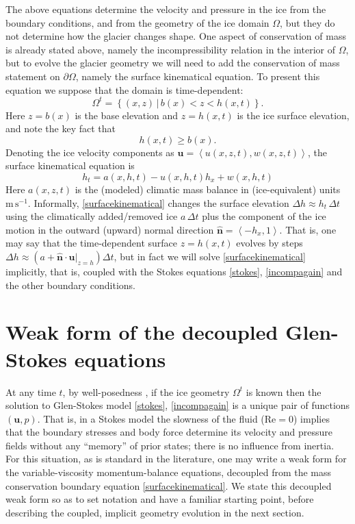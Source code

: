 \documentclass[letterpaper,final,12pt,reqno]{amsart}
\newcommand{\hbn}{\hat{\mathbf{n}}}
\newcommand{\bu}{\mathbf{u}}
\begin{document}
The above equations determine the velocity and pressure in the ice from the boundary conditions, and from the geometry of the ice domain $\Omega$, but they do not determine how the glacier changes shape.  One aspect of conservation of mass is already stated above, namely the incompressibility relation in the interior of $\Omega$, but to evolve the glacier geometry we will need to add the conservation of mass statement on $\partial\Omega$, namely the surface kinematical equation.  To present this equation we suppose that the domain is time-dependent:
\begin{equation}
\Omega^t = \left\{(x,z)\,\big|\, b(x) < z < h(x,t)\right\}.  \label{Omegat}
\end{equation}
Here $z=b(x)$ is the base elevation and $z=h(x,t)$ is the ice surface elevation, and note the key fact that
\begin{equation}
h(x,t) \ge b(x).  \label{admissibility}
\end{equation}
Denoting the ice velocity components as $\bu=\left<u(x,z,t),w(x,z,t)\right>$, the surface kinematical equation is
\begin{equation}
h_t = a(x,h,t) - u(x,h,t) h_x + w(x,h,t) \label{surfacekinematical}
\end{equation}
Here $a(x,z,t)$ is the (modeled) climatic mass balance in (ice-equivalent) units $\text{m}\,\text{s}^{-1}$.  Informally, \eqref{surfacekinematical} changes the surface elevation $\Delta h \approx h_t\,\Delta t$ using the climatically added/removed ice $a\,\Delta t$ plus the component of the ice motion in the outward (upward) normal direction $\hbn = \left<-h_x,1\right>$.  That is, one may say that the time-dependent surface $z=h(x,t)$ evolves by steps $\Delta h \approx \left(a + \hbn\cdot \bu|_{z=h}\right) \Delta t$, but in fact we will solve \eqref{surfacekinematical} implicitly, that is, coupled with the Stokes equations \eqref{stokes}, \eqref{incompagain} and the other boundary conditions.


\section{Weak form of the decoupled Glen-Stokes equations} \label{sec:weakformstokes}

At any time $t$, by well-posedness \cite{JouvetRappaz2011}, if the ice geometry $\Omega^t$ is known then the solution to Glen-Stokes model \eqref{stokes}, \eqref{incompagain} is a unique pair of functions $(\bu,p)$.  That is, in a Stokes model the slowness of the fluid ($\text{Re}=0$) implies that the boundary stresses and body force determine its velocity and pressure fields without any ``memory'' of prior states; there is no influence from inertia.  For this situation, as is standard in the literature, one may write a weak form for the variable-viscosity momentum-balance equations, decoupled from the mass conservation boundary equation \eqref{surfacekinematical}.  We state this decoupled weak form so as to set notation and have a familiar starting point, before describing the coupled, implicit geometry evolution in the next section.
\end{document}
